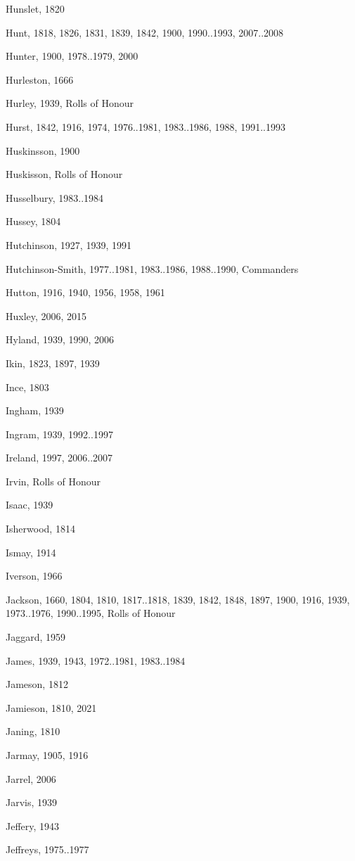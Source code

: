 {\begin{theindex}
\item Hunslet, 1820
\item Hunt, 1818, 1826, 1831, 1839, 1842, 1900, 1990..1993, 2007..2008
\item Hunter, 1900, 1978..1979, 2000
\item Hurleston, 1666
\item Hurley, 1939, Rolls of Honour
\item Hurst, 1842, 1916, 1974, 1976..1981, 1983..1986, 1988, 1991..1993
\item Huskinsson, 1900
\item Huskisson, Rolls of Honour
\item Husselbury, 1983..1984
\item Hussey, 1804
\item Hutchinson, 1927, 1939, 1991
\item Hutchinson-Smith, 1977..1981, 1983..1986, 1988..1990, Commanders
\item Hutton, 1916, 1940, 1956, 1958, 1961
\item Huxley, 2006, 2015
\item Hyland, 1939, 1990, 2006
\item Ikin, 1823, 1897, 1939
\item Ince, 1803
\item Ingham, 1939
\item Ingram, 1939, 1992..1997
\item Ireland, 1997, 2006..2007
\item Irvin, Rolls of Honour
\item Isaac, 1939
\item Isherwood, 1814
\item Ismay, 1914
\item Iverson, 1966
\item Jackson, 1660, 1804, 1810, 1817..1818, 1839, 1842, 1848, 1897, 1900, 1916, 1939, 1973..1976, 1990..1995, Rolls of Honour
\item Jaggard, 1959
\item James, 1939, 1943, 1972..1981, 1983..1984
\item Jameson, 1812
\item Jamieson, 1810, 2021
\item Janing, 1810
\item Jarmay, 1905, 1916
\item Jarrel, 2006
\item Jarvis, 1939
\item Jeffery, 1943
\item Jeffreys, 1975..1977

\end{theindex}}
